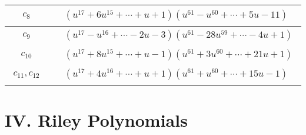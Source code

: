 \documentclass[1p]{elsarticle_modified}
\theoremstyle{definition}
\begin{document}
\begin{tabular}{m{50pt}|m{274pt}}
\hline $$\begin{aligned}c_{8}\end{aligned}$$&$\begin{aligned}
&(u^{17}+6 u^{15}+\cdots+u+1)(u^{61}- u^{60}+\cdots+5 u-11)
\end{aligned}$\\
\hline $$\begin{aligned}c_{9}\end{aligned}$$&$\begin{aligned}
&(u^{17}- u^{16}+\cdots-2 u-3)(u^{61}-28 u^{59}+\cdots-4 u+1)
\end{aligned}$\\
\hline $$\begin{aligned}c_{10}\end{aligned}$$&$\begin{aligned}
&(u^{17}+8 u^{15}+\cdots+u-1)(u^{61}+3 u^{60}+\cdots+21 u+1)
\end{aligned}$\\
\hline $$\begin{aligned}c_{11},c_{12}\end{aligned}$$&$\begin{aligned}
&(u^{17}+4 u^{16}+\cdots+u+1)(u^{61}+u^{60}+\cdots+15 u-1)
\end{aligned}$\\
\hline
\end{tabular}\newpage\renewcommand{\arraystretch}{1}
\centering \section*{ IV. Riley Polynomials}
\end{document}
